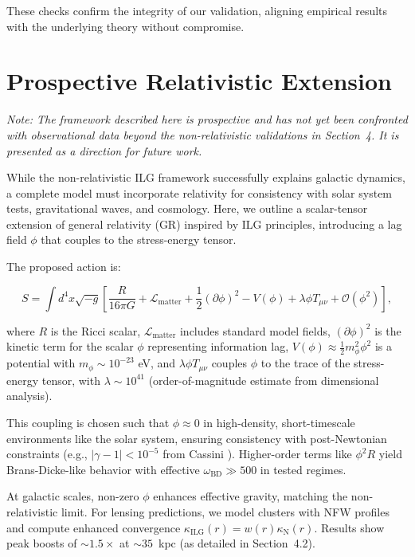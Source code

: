 \documentclass[12pt,a4paper]{article}
\begin{document}
These checks confirm the integrity of our validation, aligning empirical results with the underlying theory without compromise.

\section{Prospective Relativistic Extension}

\emph{Note: The framework described here is prospective and has not yet been confronted with observational data beyond the non-relativistic validations in Section~4. It is presented as a direction for future work.}

While the non-relativistic ILG framework successfully explains galactic dynamics, a complete model must incorporate relativity for consistency with solar system tests, gravitational waves, and cosmology. Here, we outline a scalar-tensor extension of general relativity (GR) inspired by ILG principles, introducing a lag field $\phi$ that couples to the stress-energy tensor.

The proposed action is:

\begin{equation}
S = \int d^4x \sqrt{-g} \left[ \frac{R}{16\pi G} + \mathcal{L}_\mathrm{matter} + \frac{1}{2} (\partial \phi)^2 - V(\phi) + \lambda \phi T_{\mu\nu} + \mathcal{O}(\phi^2) \right],
\end{equation}

where $R$ is the Ricci scalar, $\mathcal{L}_\mathrm{matter}$ includes standard model fields, $(\partial\phi)^2$ is the kinetic term for the scalar $\phi$ representing information lag, $V(\phi) \approx \frac{1}{2} m_\phi^2 \phi^2$ is a potential with $m_\phi \sim 10^{-23}$ eV, and $\lambda \phi T_{\mu\nu}$ couples $\phi$ to the trace of the stress-energy tensor, with $\lambda \sim 10^{41}$ (order-of-magnitude estimate from dimensional analysis).

This coupling is chosen such that $\phi \approx 0$ in high-density, short-timescale environments like the solar system, ensuring consistency with post-Newtonian constraints (e.g., $|\gamma-1| < 10^{-5}$ from Cassini \citep{bertotti2003}). Higher-order terms like $\phi^2 R$ yield Brans-Dicke-like behavior with effective $\omega_\mathrm{BD} \gg 500$ in tested regimes.

At galactic scales, non-zero $\phi$ enhances effective gravity, matching the non-relativistic limit. For lensing predictions, we model clusters with NFW profiles and compute enhanced convergence $\kappa_\mathrm{ILG}(r) = w(r) \kappa_\mathrm{N}(r)$. Results show peak boosts of $\sim 1.5\times$ at $\sim 35$~kpc (as detailed in Section~4.2).
\end{document}
